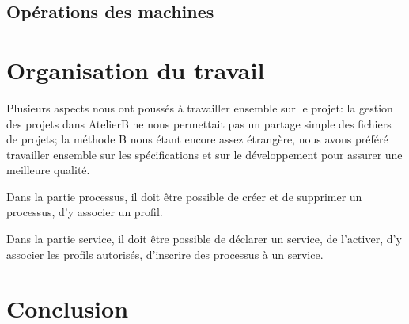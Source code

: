 \documentclass[french, titlepage, 10pt, a4paper]{article}
\begin{document}
\subsection{Opérations des machines}

\section{Organisation du travail}
Plusieurs aspects nous ont poussés à travailler ensemble sur le projet: la
gestion des projets dans AtelierB ne nous permettait pas un partage simple des
fichiers de projets; la méthode B nous étant encore assez étrangère, nous avons
préféré travailler ensemble sur les spécifications et sur le développement pour
assurer une meilleure qualité.

Dans la partie processus, il doit être possible de créer et de supprimer un
processus, d'y associer un profil.

Dans la partie service, il doit être possible de déclarer un service, de
l'activer, d'y associer les profils autorisés, d'inscrire des processus à un
service.

\section{Conclusion}
\end{document}
